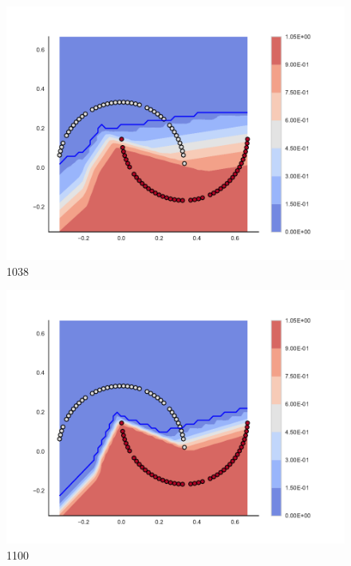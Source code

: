 \begin{subfigure}[b]{0.09\textwidth}
    \includegraphics[clip, trim=2.35cm 1.75cm 4.5cm 0cm,width=\textwidth]{img/convergence/1038.pdf}
    \caption{1038}
    \label{fig:convergence_1038}
\end{subfigure}
%
\begin{subfigure}[b]{0.09\textwidth}
    \includegraphics[clip, trim=2.35cm 1.75cm 4.5cm 0cm,width=\textwidth]{img/convergence/1100.pdf}
    \caption{1100}
    \label{fig:convergence_1100}
\end{subfigure}
%

